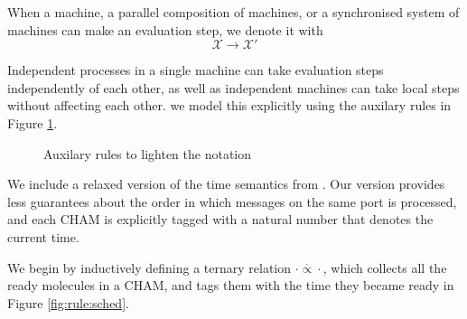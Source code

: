 When a machine, a parallel composition of machines, or a synchronised system of
machines can make an evaluation step, we denote it with
\begin{equation*}
 \boxed{\mathcal{X} \longrightarrow \mathcal{X}'}
\end{equation*}

Independent processes in a single machine can take evaluation steps
independently of each other, as well as independent machines can take local
steps without affecting each other.  we model this explicitly using the
auxilary rules in Figure \ref{fig:rule:aux}.
\begin{figure}[!h]
\caption{Auxilary rules to lighten the notation}\label{fig:rule:aux}
\end{figure}

We include a relaxed version of the time semantics from \cite{timed-join}. Our
version provides less guarantees about the order in which messages on the same
port is processed, and each CHAM is explicitly tagged with a natural number
that denotes the current time.

We begin by inductively defining a ternary relation $\cdot
\stackrel{\cdot}{\propto} \cdot$, which collects all the ready molecules in a
CHAM, and tags them with the time they became ready in Figure \ref{fig:rule:sched}.

